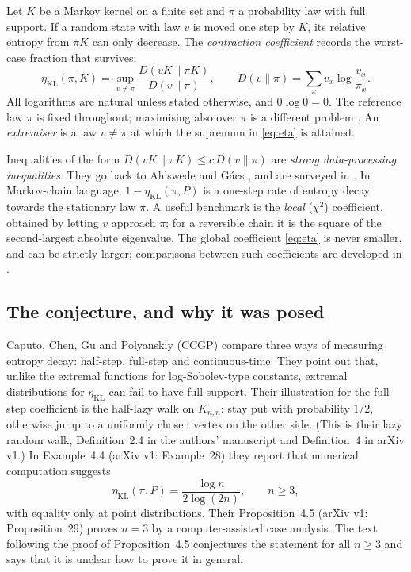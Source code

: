 \documentclass[11pt,a4paper]{article}
\numberwithin{equation}{section}
\theoremstyle{definition}
\theoremstyle{remark}
\newcommand{\KL}{D}
\newcommand{\etaKL}{\eta_{\mathrm{KL}}}
\begin{document}
Let \(K\) be a Markov kernel on a finite set and \(\pi\) a probability law
with full support. If a random state with law \(v\) is moved one step by
\(K\), its relative entropy from \(\pi K\) can only decrease. The
\emph{contraction coefficient} records the worst-case fraction that
survives:
\begin{equation}\label{eq:eta}
\etaKL(\pi,K)=\sup_{v\ne\pi}
\frac{\KL(vK\|\pi K)}{\KL(v\|\pi)},\qquad
\KL(v\|\pi)=\sum_x v_x\log\frac{v_x}{\pi_x}.
\end{equation}
All logarithms are natural unless stated otherwise, and \(0\log0=0\). The
reference law \(\pi\) is fixed throughout; maximising also over \(\pi\) is a
different problem \cite{ordentlich}. An \emph{extremiser} is a law
\(v\ne\pi\) at which the supremum in \eqref{eq:eta} is attained.

Inequalities of the form \(\KL(vK\|\pi K)\le c\,\KL(v\|\pi)\) are
\emph{strong data-processing inequalities}. They go back to Ahlswede and
G\'acs \cite{ahlswede}, and are surveyed in
\cite{raginsky,polyanskiywu}. In Markov-chain language, \(1-\etaKL(\pi,P)\)
is a one-step rate of entropy decay towards the stationary law \(\pi\). A
useful benchmark is the \emph{local} (\(\chi^2\)) coefficient, obtained by
letting \(v\) approach \(\pi\); for a reversible chain it is the square of
the second-largest absolute eigenvalue. The global coefficient
\eqref{eq:eta} is never smaller, and can be strictly larger; comparisons
between such coefficients are developed in \cite{makur,raginsky}.

\subsection{The conjecture, and why it was posed}

Caputo, Chen, Gu and Polyanskiy (CCGP) \cite{caputo} compare three ways of
measuring entropy decay: half-step, full-step and continuous-time. They
point out that, unlike the extremal functions for log-Sobolev-type
constants, extremal distributions for \(\etaKL\) can fail to have full
support. Their illustration for the full-step coefficient is the half-lazy
walk on \(K_{n,n}\): stay put with probability \(1/2\), otherwise jump to a
uniformly chosen vertex on the other side. (This is their lazy random walk,
Definition~2.4 in the authors' manuscript and Definition~4 in arXiv
v1.) In Example~4.4 (arXiv v1: Example~28) they report that numerical
computation suggests
\begin{equation}\label{eq:conjecture}
\etaKL(\pi,P)=\frac{\log n}{2\log(2n)},\qquad n\ge3,
\end{equation}
with equality only at point distributions. Their Proposition~4.5 (arXiv v1:
Proposition~29) proves \(n=3\) by a computer-assisted case analysis. The
text following the proof of Proposition~4.5 conjectures the statement for
all \(n\ge3\) and says that it is unclear how to prove it in general.
\end{document}
